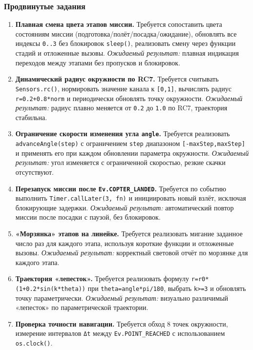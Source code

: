 \subsubsection{Продвинутые задания}
\begin{enumerate}
  \item \textbf{Плавная смена цвета этапов миссии.}
    Требуется сопоставить цвета состояниям миссии (подготовка/полёт/посадка/ожидание), обновлять все индексы \texttt{0..3} без блокировок \texttt{sleep()}, реализовать смену через функции стадий и отложенные вызовы.
    \textit{Ожидаемый результат:} плавная индикация переходов между этапами без пропусков и блокировок.
  \item \textbf{Динамический радиус окружности по RC7.}
    Требуется считывать \texttt{Sensors.rc()}, нормировать значение канала к \texttt{[0,1]}, вычислять радиус \texttt{r=0.2+0.8*norm} и периодически обновлять точку окружности.
    \textit{Ожидаемый результат:} радиус плавно меняется от \texttt{0.2} до \texttt{1.0} по RC7, траектория стабильна.
  \item \textbf{Ограничение скорости изменения угла \texttt{angle}.}
    Требуется реализовать \texttt{advanceAngle(step)} с ограничением \texttt{step} диапазоном \texttt{[-maxStep,maxStep]} и применять его при каждом обновлении параметра окружности.
    \textit{Ожидаемый результат:} угол изменяется с ограниченной скоростью, резкие скачки отсутствуют.
  \item \textbf{Перезапуск миссии после \texttt{Ev.COPTER\_LANDED}.}
    Требуется по событию выполнить \texttt{Timer.callLater(3, fn)} и инициировать новый взлёт, исключая блокирующие задержки.
    \textit{Ожидаемый результат:} автоматический повтор миссии после посадки с паузой, без блокировок.
  \item \textbf{«Морзянка» этапов на линейке.}
    Требуется реализовать мигание заданное число раз для каждого этапа, используя короткие функции и отложенные вызовы.
    \textit{Ожидаемый результат:} корректный световой отчёт по морзянке для каждого этапа.
  \item \textbf{Траектория «лепесток».}
    Требуется реализовать формулу \texttt{r=r0*(1+0.2*sin(k*theta))} при \texttt{theta=angle*pi/180}, выбрать \texttt{k>=3} и обновлять точку параметрически.
    \textit{Ожидаемый результат:} визуально различимый «лепесток» по параметрической траектории.
  \item \textbf{Проверка точности навигации.}
    Требуется обход 8 точек окружности, измерение интервалов \texttt{Δt} между \texttt{Ev.POINT\_REACHED} с использованием \texttt{os.clock()}.

\end{enumerate}
